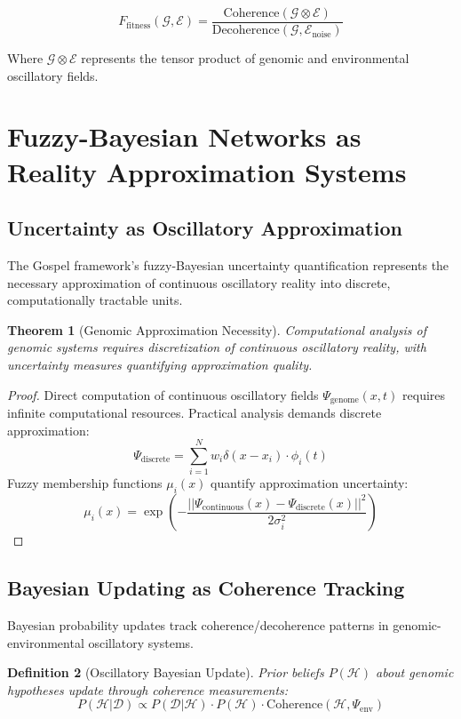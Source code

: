 \documentclass[12pt,a4paper]{article}
\newtheorem{theorem}{Theorem}[section]
\newtheorem{definition}[theorem]{Definition}
\begin{document}
$$F_{\text{fitness}}(\mathcal{G}, \mathcal{E}) = \frac{\text{Coherence}(\mathcal{G} \otimes \mathcal{E})}{\text{Decoherence}(\mathcal{G}, \mathcal{E}_{\text{noise}})}$$

Where $\mathcal{G} \otimes \mathcal{E}$ represents the tensor product of genomic and environmental oscillatory fields.

\section{Fuzzy-Bayesian Networks as Reality Approximation Systems}

\subsection{Uncertainty as Oscillatory Approximation}

The Gospel framework's fuzzy-Bayesian uncertainty quantification represents the necessary approximation of continuous oscillatory reality into discrete, computationally tractable units.

\begin{theorem}[Genomic Approximation Necessity]
Computational analysis of genomic systems requires discretization of continuous oscillatory reality, with uncertainty measures quantifying approximation quality.
\end{theorem}

\begin{proof}
Direct computation of continuous oscillatory fields $\Psi_{\text{genome}}(x,t)$ requires infinite computational resources. Practical analysis demands discrete approximation:
$$\Psi_{\text{discrete}} = \sum_{i=1}^{N} w_i \delta(x - x_i) \cdot \phi_i(t)$$
Fuzzy membership functions $\mu_i(x)$ quantify approximation uncertainty:
$$\mu_i(x) = \exp\left(-\frac{||\Psi_{\text{continuous}}(x) - \Psi_{\text{discrete}}(x)||^2}{2\sigma_i^2}\right)$$
\end{proof}

\subsection{Bayesian Updating as Coherence Tracking}

Bayesian probability updates track coherence/decoherence patterns in genomic-environmental oscillatory systems.

\begin{definition}[Oscillatory Bayesian Update]
Prior beliefs $P(\mathcal{H})$ about genomic hypotheses update through coherence measurements:
$$P(\mathcal{H}|\mathcal{D}) \propto P(\mathcal{D}|\mathcal{H}) \cdot P(\mathcal{H}) \cdot \text{Coherence}(\mathcal{H}, \Psi_{\text{env}})$$
\end{definition}
\end{document}
